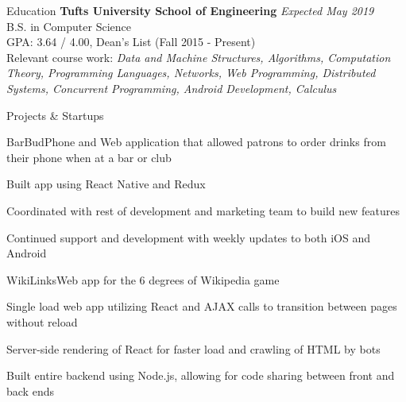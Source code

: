 \documentclass{resume}
\begin{document}
  \begin{rSection}{Education}
    {\bf Tufts University School of Engineering} \hfill {\em Expected May 2019} \\ 
    { B.S. in Computer Science} \\
    GPA: 3.64 / 4.00, Dean's List (Fall 2015 - Present)\\
    Relevant course work: \textit{Data and Machine Structures, Algorithms, Computation Theory, Programming Languages, Networks, Web Programming, Distributed Systems, Concurrent Programming, Android Development,  Calculus}
  \end{rSection}
  
  \begin{rSection}{Projects \& Startups}
  
    \begin{rSubsection}{BarBud}{}{\normalfont Phone and Web application that allowed patrons to order drinks from their phone when at a bar or club}{}
    \item Built app using React Native and Redux
    \item Coordinated with rest of development and marketing team to build new features
    \item Continued support and development with weekly updates to both iOS and Android
  \end{rSubsection}
  
  \begin{rSubsection}{WikiLinks}{}{\normalfont Web app for the 6 degrees of Wikipedia game}{}
  \item Single load web app utilizing React and AJAX calls to transition between pages without reload
  \item Server-side rendering of React for faster load and crawling of HTML by bots
  \item Built entire backend using Node.js, allowing for code sharing between front and back ends
  \end{rSubsection}
   
  \end{rSection}
  
\end{document}
